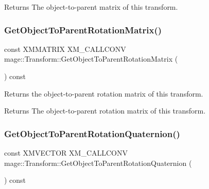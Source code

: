 \begin{DoxyReturn}{Returns}
The object-\/to-\/parent matrix of this transform. 
\end{DoxyReturn}
\hypertarget{classmage_1_1_transform_a2f86a149ce70931f0019ebbe740ba30f}{}\label{classmage_1_1_transform_a2f86a149ce70931f0019ebbe740ba30f} 
\subsubsection{\texorpdfstring{Get\+Object\+To\+Parent\+Rotation\+Matrix()}{GetObjectToParentRotationMatrix()}}
{\footnotesize\ttfamily const X\+M\+M\+A\+T\+R\+IX X\+M\+\_\+\+C\+A\+L\+L\+C\+O\+NV mage\+::\+Transform\+::\+Get\+Object\+To\+Parent\+Rotation\+Matrix (\begin{DoxyParamCaption}{ }\end{DoxyParamCaption}) const\hspace{0.3cm}{\ttfamily [noexcept]}}

Returns the object-\/to-\/parent rotation matrix of this transform.

\begin{DoxyReturn}{Returns}
The object-\/to-\/parent rotation matrix of this transform. 
\end{DoxyReturn}
\hypertarget{classmage_1_1_transform_a26cc5edc32e86bad8f3b798b39206998}{}\label{classmage_1_1_transform_a26cc5edc32e86bad8f3b798b39206998} 
\subsubsection{\texorpdfstring{Get\+Object\+To\+Parent\+Rotation\+Quaternion()}{GetObjectToParentRotationQuaternion()}}
{\footnotesize\ttfamily const X\+M\+V\+E\+C\+T\+OR X\+M\+\_\+\+C\+A\+L\+L\+C\+O\+NV mage\+::\+Transform\+::\+Get\+Object\+To\+Parent\+Rotation\+Quaternion (\begin{DoxyParamCaption}{ }\end{DoxyParamCaption}) const\hspace{0.3cm}{\ttfamily [noexcept]}}

